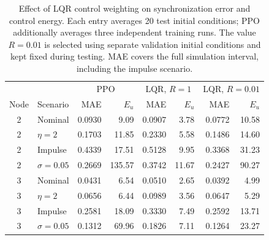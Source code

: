 \begin{table}[pos=!t,width=\textwidth]
\centering
\normalsize
\setlength{\tabcolsep}{6pt}
\renewcommand{\arraystretch}{1.15}
\caption{Effect of LQR control weighting on synchronization error and control energy. Each entry averages 20 test initial conditions; PPO additionally averages three independent training runs. The value $R=0.01$ is selected using separate validation initial conditions and kept fixed during testing. MAE covers the full simulation interval, including the impulse scenario.}
\label{tab:lqr_weight_sensitivity}
\begin{tabular}{@{}clrrrrrr@{}}
\toprule
 & & \multicolumn{2}{c}{PPO} & \multicolumn{2}{c}{LQR, $R=1$} & \multicolumn{2}{c}{LQR, $R=0.01$} \\
Node & Scenario & MAE & $E_u$ & MAE & $E_u$ & MAE & $E_u$ \\
\midrule
2 & Nominal & 0.0930 & 9.09 & 0.0907 & 3.78 & 0.0772 & 10.58 \\
2 & $\eta=2$ & 0.1703 & 11.85 & 0.2330 & 5.58 & 0.1486 & 14.60 \\
2 & Impulse & 0.4339 & 17.51 & 0.5128 & 9.95 & 0.3368 & 31.23 \\
2 & $\sigma=0.05$ & 0.2669 & 135.57 & 0.3742 & 11.67 & 0.2427 & 90.27 \\
\midrule
3 & Nominal & 0.0431 & 6.54 & 0.0510 & 2.65 & 0.0392 & 4.99 \\
3 & $\eta=2$ & 0.0656 & 6.44 & 0.0989 & 3.56 & 0.0647 & 5.29 \\
3 & Impulse & 0.2581 & 18.09 & 0.3330 & 7.49 & 0.2592 & 13.71 \\
3 & $\sigma=0.05$ & 0.1312 & 69.96 & 0.1826 & 7.11 & 0.1264 & 23.27 \\
\bottomrule
\end{tabular}
\end{table}
